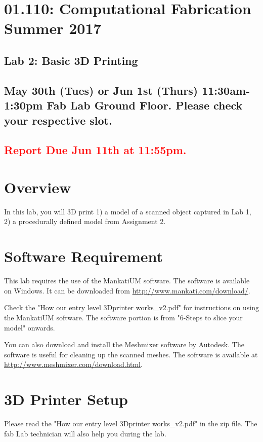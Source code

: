 \documentclass{article}
\begin{document}
\section*{01.110: Computational Fabrication Summer 2017}

\subsection*{Lab 2: Basic 3D Printing}

\subsection*{May 30th (Tues) or Jun 1st (Thurs) 11:30am-1:30pm Fab Lab Ground Floor. Please check your respective slot.}

\subsection*{\textcolor{red}{Report Due Jun 11th at 11:55pm.}}


\section{Overview}
In this lab, you will 3D print 1) a model of a scanned object captured in Lab 1, 2) a procedurally defined model from Assignment 2.

\section{Software Requirement}
This lab requires the use of the MankatiUM software. The software is available on Windows. It can be downloaded from \url{http://www.mankati.com/download/}. 

Check the "How our entry level 3D\-printer works\_v2.pdf" for instructions on using the MankatiUM software. The software portion is from "6-Steps to slice your model" onwards. 

You can also download and install the Meshmixer software by Autodesk. The software is useful for cleaning up the scanned meshes. The software is available at
\url{http://www.meshmixer.com/download.html}. 

\section{3D Printer Setup}
Please read the "How our entry level 3D\-printer works\_v2.pdf" in the zip file. The fab Lab technician will also help you during the lab. 
\end{document}
